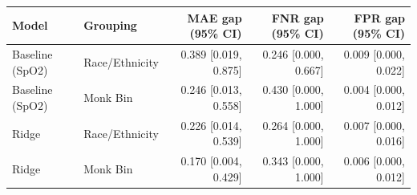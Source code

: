 \begin{tabular}{llrrr}
\toprule
Model & Grouping & MAE gap (95\% CI) & FNR gap (95\% CI) & FPR gap (95\% CI) \\
\midrule
Baseline (SpO2) & Race/Ethnicity & 0.389 [0.019, 0.875] & 0.246 [0.000, 0.667] & 0.009 [0.000, 0.022] \\
Baseline (SpO2) & Monk Bin & 0.246 [0.013, 0.558] & 0.430 [0.000, 1.000] & 0.004 [0.000, 0.012] \\
Ridge & Race/Ethnicity & 0.226 [0.014, 0.539] & 0.264 [0.000, 1.000] & 0.007 [0.000, 0.016] \\
Ridge & Monk Bin & 0.170 [0.004, 0.429] & 0.343 [0.000, 1.000] & 0.006 [0.000, 0.012] \\
\bottomrule
\end{tabular}
